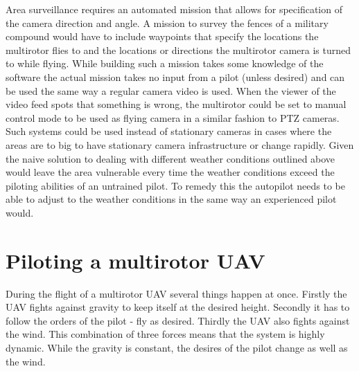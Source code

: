 \documentclass[12pt,oneside]{reedthesis}
\theoremstyle{definition}
\theoremstyle{definition}
\theoremstyle{definition}
\theoremstyle{remark}
\begin{document}
Area surveillance requires an automated mission that allows for
specification of the camera direction and angle. A mission to survey the
fences of a military compound would have to include waypoints that
specify the locations the multirotor flies to and the locations or
directions the multirotor camera is turned to while flying. While
building such a mission takes some knowledge of the software the actual
mission takes no input from a pilot (unless desired) and can be used the
same way a regular camera video is used. When the viewer of the video
feed spots that something is wrong, the multirotor could be set to
manual control mode to be used as flying camera in a similar fashion to
PTZ cameras. Such systems could be used instead of stationary cameras in
cases where the areas are to big to have stationary camera
infrastructure or change rapidly. Given the naive solution to dealing
with different weather conditions outlined above would leave the area
vulnerable every time the weather conditions exceed the piloting
abilities of an untrained pilot. To remedy this the autopilot needs to
be able to adjust to the weather conditions in the same way an
experienced pilot would.

\chapter{Piloting a multirotor UAV}\label{piloting}

During the flight of a multirotor UAV several things happen at once.
Firstly the UAV fights against gravity to keep itself at the desired
height. Secondly it has to follow the orders of the pilot - fly as
desired. Thirdly the UAV also fights against the wind. This combination
of three forces means that the system is highly dynamic. While the
gravity is constant, the desires of the pilot change as well as the
wind.
\end{document}

